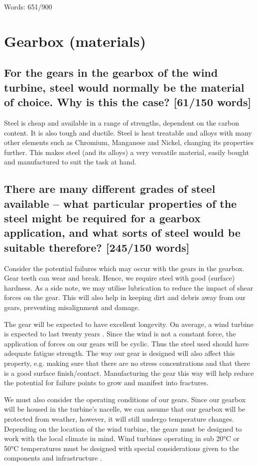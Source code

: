 \documentclass[12pt]{article}
\numberwithin{equation}{section}
\begin{document}
\begin{flushleft}
Words: 651/900
\section{Gearbox (materials)}
\subsection[Why is steel used?]{For the gears in the gearbox of the wind turbine, steel would normally be the material of choice. Why is this the case? [61/150 words]}
Steel is cheap and available in a range of strengths, dependent on the carbon content. It is also tough and ductile. Steel is heat treatable and alloys with many other elements such as Chromium, Manganese and Nickel, changing its properties further. This makes steel (and its alloys) a very versatile material, easily bought and manufactured to suit the task at hand.
\subsection[Which steel is more suitable?]{There are many different grades of steel available – what particular properties of the steel might be required for a gearbox application, and what sorts of steel would be suitable therefore? [245/150 words]}
Consider the potential failures which may occur with the gears in the gearbox. Gear teeth can wear and break. Hence, we require steel with good (surface) hardness. As a side note, we may utilise lubrication to reduce the impact of shear forces on the gear. This will also help in keeping dirt and debris away from our gears, preventing misalignment and damage. 

The gear will be expected to have excellent longevity. On average, a wind turbine is expected to last twenty years \citep{windTurbineLifetime}. Since the wind is not a constant force, the application of forces on our gears will be cyclic. Thus the steel used should have adequate fatigue strength. The way our gear is designed will also affect this property, e.g. making sure that there are no stress concentrations and that there is a good surface finish/contact. Manufacturing the gear this way will help reduce the potential for failure points to grow and manifest into fractures. 

We must also consider the operating conditions of our gears. Since our gearbox will be housed in the turbine's nacelle, we can assume that our gearbox will be protected from weather, however, it will still undergo temperature changes. Depending on the location of the wind turbine, the gears must be designed to work with the local climate in mind. Wind turbines operating in sub 20\si{\celsius} or 50\si{\celsius} temperatures must be designed with special considerations given to the components and infrastructure \citep{windTurbineOperatingConditions}. 


\end{flushleft}
\end{document}

